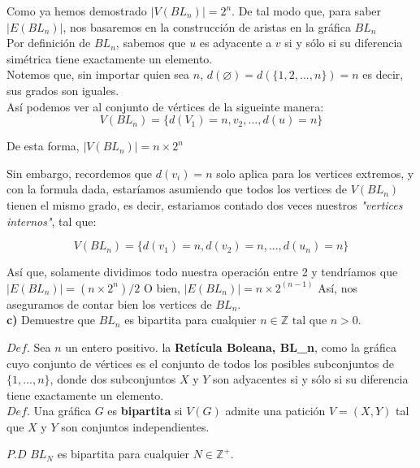 \documentclass[12pt]{article}
\begin{document}
Como ya hemos demostrado $|V(BL_n)| = 2^n$. De tal modo que, para saber $|E(BL_n)|$, nos basaremos en la construcción de aristas en la gráfica $BL_n$\\

Por definición de $BL_n$, sabemos que $u$ es adyacente a $v$ si y sólo si su diferencia simétrica tiene exactamente un elemento.\\

Notemos que, sin importar quien sea $n$, $d(\varnothing) = d(\{1, 2, ... , n\}) = n$ es decir, sus grados son iguales.\\

Así podemos ver al conjunto de vértices de la sigueinte manera:
\[V(BL_n) = \{d(V_1) = n, v_2, ... , d(u) = n \}\]

De esta forma, $| V(BL_n) | = n \times 2^n$

Sin embargo, recordemos que $d(v_i) = n$ solo aplica para los vertices extremos, y con la formula dada, estaríamos asumiendo que todos los vertices de $V(BL_n)$ 
tienen el mismo grado, es decir, estariamos contado dos veces nuestros \textit{"vertices internos"}, tal que: 

\[V(BL_n) = \{ d(v_1) = n, d(v_2) = n, ..., d(u_n) = n \}\]

Así que, solamente dividimos todo nuestra operación entre 2 y tendríamos que $| E(BL_n) | = (n \times 2^n) / 2$
O bien, $| E(BL_n) | = n \times 2^(n - 1)$ Así, nos aseguramos de contar bien los vertices de $BL_n$.\\
 
\textbf{c)} Demuestre que $BL_n$ es bipartita para cualquier $n \in \mathbb{Z} \text{ tal que } n > 0$.

\begin{tcolorbox}[title=\textbf{Definiciones}, colback=blue!15!white, colframe=black!]
    $Def$. Sea $n$ un entero positivo. la \textbf{Retícula Boleana, BL\_n}, como
    la gráfica cuyo conjunto de vértices es el conjunto de todos los posibles subconjuntos
    de $\{1, ..., n\}$, donde dos subconjuntos $X$ y $Y$ son adyacentes si y sólo si su diferencia
    tiene exactamente un elemento.\\

    $Def.$ Una gráfica $G$ es \textbf{bipartita} si $V(G)$ admite una patición $V = (X, Y)$ tal que $X$ y $Y$ son conjuntos independientes.
\end{tcolorbox}

$P.D$ $BL_N$ es bipartita para cualquier $N \in \mathbb{Z^+}$.\\
\end{document}
